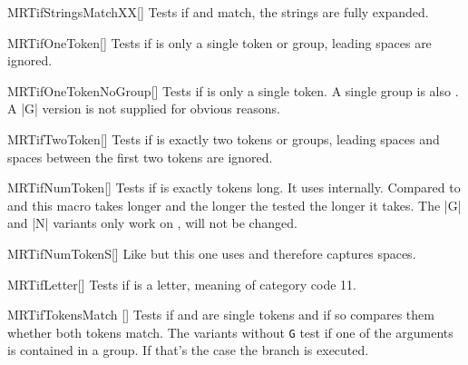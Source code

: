 \begin{describemacroTF}[G]{MRTifStringsMatchXX}[]
  Tests if  and  match, the strings are fully
  expanded.
\end{describemacroTF}

\begin{describemacroTF}[G,N,GN]{MRTifOneToken}[]
  Tests if  is only a single token or group, leading spaces are
  ignored.
\end{describemacroTF}

\begin{describemacroTF}[N]{MRTifOneTokenNoGroup}[]
  Tests if  is only a single token. A single group is also
  . A |G| version is not supplied for obvious reasons.
\end{describemacroTF}

\begin{describemacroTF}[G,N,GN]{MRTifTwoToken}[]
  Tests if  is exactly two tokens or groups, leading spaces and spaces
  between the first two tokens are ignored.
\end{describemacroTF}

\begin{describemacroTF}[G,N,GN]{MRTifNumToken}[]
  Tests if  is exactly  tokens long. It uses
   internally. Compared to  and
   this macro takes longer and the longer the tested
   the longer it takes. The |G| and |N| variants only work on
  ,  will not be changed.
\end{describemacroTF}

\begin{describemacroTF}[G,N,GN]{MRTifNumTokenS}[]
  Like  but this one uses  and therefore
  captures spaces.
\end{describemacroTF}

\begin{describemacroTF}[G,N,GN]{MRTifLetter}[]
  Tests if  is a letter, meaning of category code 11.
\end{describemacroTF}

\begin{describemacroTF}{MRTifTokensMatch}%
  []
  Tests if  and  are single tokens and if so compares
  them whether both tokens match. The variants without \texttt{G} test if one of
  the arguments is contained in a group. If that's the case the 
  branch is executed.
\end{describemacroTF}

